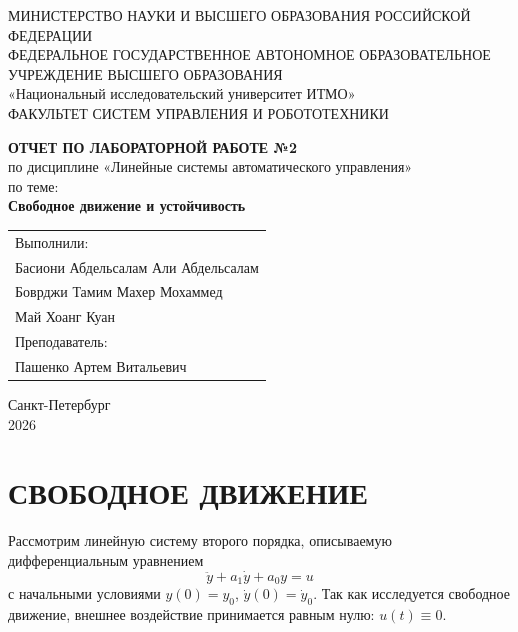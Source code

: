 \documentclass[14pt,a4paper]{extarticle}
\begin{document}
\begin{titlepage}
\begin{center}
\small
МИНИСТЕРСТВО НАУКИ И ВЫСШЕГО ОБРАЗОВАНИЯ РОССИЙСКОЙ\\
ФЕДЕРАЦИИ\\[0.3em]
ФЕДЕРАЛЬНОЕ ГОСУДАРСТВЕННОЕ АВТОНОМНОЕ ОБРАЗОВАТЕЛЬНОЕ\\
УЧРЕЖДЕНИЕ ВЫСШЕГО ОБРАЗОВАНИЯ\\[0.3em]
«Национальный исследовательский университет ИТМО»\\[0.8em]
\normalsize
ФАКУЛЬТЕТ СИСТЕМ УПРАВЛЕНИЯ И РОБОТОТЕХНИКИ

\vfill

{\bfseries ОТЧЕТ ПО ЛАБОРАТОРНОЙ РАБОТЕ №2}\\[0.5em]
по дисциплине «Линейные системы автоматического управления»\\[0.5em]
по теме:\\
{\bfseries Свободное движение и устойчивость}

\vfill

\begin{flushright}
\begin{tabular}{l}
Выполнили:\\
Басиони Абдельсалам Али Абдельсалам\\
Боврджи Тамим Махер Мохаммед\\
Май Хоанг Куан\\[1em]
Преподаватель:\\
Пашенко Артем Витальевич
\end{tabular}
\end{flushright}

\vfill

Санкт-Петербург\\
2026
\end{center}
\end{titlepage}

\setcounter{page}{2}

\newpage

\tableofcontents

\newpage
\section{СВОБОДНОЕ ДВИЖЕНИЕ}

Рассмотрим линейную систему второго порядка, описываемую дифференциальным уравнением
\begin{equation}\label{eq:sys2}
  \ddot y + a_1\dot y + a_0 y = u
\end{equation}
с начальными условиями $y(0)=y_0$, $\dot y(0)=\dot y_0$.
Так как исследуется свободное движение, внешнее воздействие принимается равным нулю: $u(t)\equiv 0$.
\end{document}
